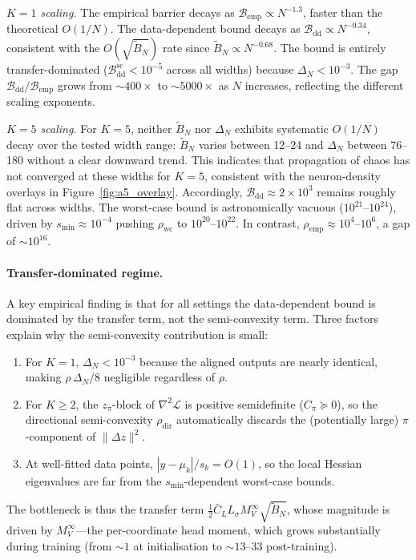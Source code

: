 \documentclass[11pt]{article}
\newcommand{\cL}{\mathcal{L}}
\newcommand{\cB}{\mathcal{B}}
\begin{document}
\emph{$K=1$ scaling.}
The empirical barrier decays as $\cB_{\mathrm{emp}} \propto N^{-1.3}$,
faster than the theoretical $O(1/N)$.
The data-dependent bound decays as
$\cB_{\mathrm{dd}} \propto N^{-0.34}$,
consistent with the $O(\sqrt{\tilde B_N})$ rate since
$\tilde B_N \propto N^{-0.68}$.
The bound is entirely transfer-dominated
($\cB_{\mathrm{dd}}^{\mathrm{sc}} < 10^{-5}$ across all widths)
because $\Delta_N < 10^{-3}$.
The gap $\cB_{\mathrm{dd}}/\cB_{\mathrm{emp}}$ grows from
$\sim\!400\times$ to $\sim\!5000\times$ as $N$ increases,
reflecting the different scaling exponents.

\emph{$K=5$ scaling.}
For $K=5$, neither $\tilde B_N$ nor $\Delta_N$ exhibits
systematic $O(1/N)$ decay over the tested width range:
$\tilde B_N$ varies between 12--24 and $\Delta_N$ between 76--180
without a clear downward trend.
This indicates that propagation of chaos has not converged
at these widths for $K=5$,
consistent with the neuron-density overlays in
Figure~\ref{fig:a5_overlay}.
Accordingly, $\cB_{\mathrm{dd}} \approx 2 \times 10^3$
remains roughly flat across widths.
The worst-case bound is astronomically vacuous
($10^{21}$--$10^{24}$), driven by
$s_{\min} \approx 10^{-4}$ pushing
$\rho_{\mathrm{wc}}$ to $10^{20}$--$10^{22}$.
In contrast, $\rho_{\mathrm{emp}} \approx 10^{4}$--$10^{6}$,
a gap of $\sim\!10^{16}$.

\paragraph{Transfer-dominated regime.}
A key empirical finding is that for all settings the
data-dependent bound is dominated by the transfer term,
not the semi-convexity term.
Three factors explain why the semi-convexity contribution is small:
\begin{enumerate}[leftmargin=*,itemsep=2pt]
\item For $K=1$, $\Delta_N < 10^{-3}$ because the aligned outputs
  are nearly identical, making $\rho\,\Delta_N/8$ negligible
  regardless of $\rho$.
\item For $K \ge 2$,
  the $z_\pi$-block of $\nabla^2\cL$ is positive semidefinite
  ($C_\pi \succeq 0$),
  so the directional semi-convexity $\rho_{\mathrm{dir}}$
  automatically discards the (potentially large) $\pi$-component
  of $\|\Delta z\|^2$.
\item At well-fitted data points, $|y-\mu_k|/s_k = O(1)$,
  so the local Hessian eigenvalues are far from the $s_{\min}$-dependent
  worst-case bounds.
\end{enumerate}
The bottleneck is thus the transfer term
$\tfrac{1}{2}\bar C_L L_\sigma M_V^\infty \sqrt{\tilde B_N}$,
whose magnitude is driven by $M_V^\infty$---the per-coordinate head
moment, which grows substantially during training
(from $\sim\!1$ at initialisation to $\sim\!13$--$33$ post-training).
\end{document}
